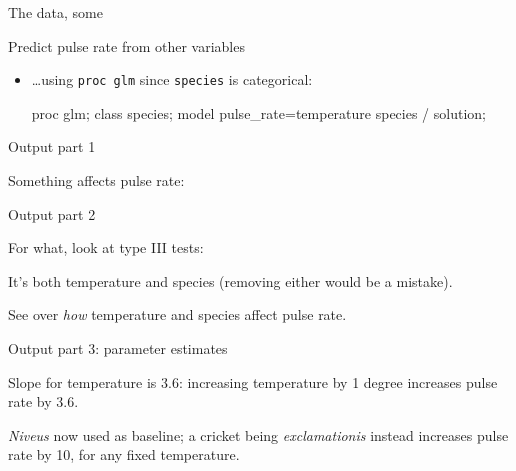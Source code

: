 \documentclass[unknownkeysallowed]{beamer}\usepackage[]{graphicx}\usepackage[]{color}
\begin{document}
\begin{frame}[fragile]{The data, some}
  
  
\end{frame}

\begin{frame}[fragile]{Predict pulse rate from other variables}
  
  \begin{itemize}
  \item \ldots using \texttt{proc glm} since \texttt{species} is categorical:
    
    \begin{Sascode}[store=zereq]
proc glm;
  class species;
  model pulse_rate=temperature species / solution;
    \end{Sascode}
  \end{itemize}
  
\end{frame}

\begin{frame}[fragile]{Output part 1}
  
  Something affects pulse rate:
  
  
\end{frame}

\begin{frame}[fragile]{Output part 2}
  
  For what, look at type III tests:
  
  
  It's both temperature and species (removing either would be a mistake).
  
  See over \emph{how} temperature and species affect pulse rate.
  
\end{frame}

\begin{frame}[fragile]{Output part 3: parameter estimates}
  
  
  Slope for temperature is 3.6: increasing temperature by 1 degree
  increases pulse rate by 3.6.
  
  \textsl{Niveus} now used as baseline; a cricket being
  \textsl{exclamationis} instead increases pulse rate by 10,
  for any fixed temperature.
  
\end{frame}
\end{document}
